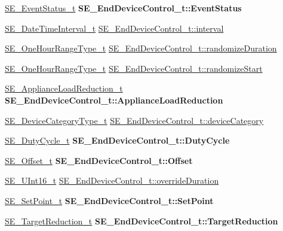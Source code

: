 \begin{DoxyCompactItemize}
\hyperlink{structSE__EventStatus__t}{S\+E\+\_\+\+Event\+Status\+\_\+t} {\bfseries S\+E\+\_\+\+End\+Device\+Control\+\_\+t\+::\+Event\+Status}
\item 
\hyperlink{structSE__DateTimeInterval__t}{S\+E\+\_\+\+Date\+Time\+Interval\+\_\+t} \hyperlink{group__EndDeviceControl_ga6b0199442cfc19ab1caaf0005b9d1900}{S\+E\+\_\+\+End\+Device\+Control\+\_\+t\+::interval}
\item 
\hyperlink{group__OneHourRangeType_ga2b9c57435b20a5fc0689922b77e97c2d}{S\+E\+\_\+\+One\+Hour\+Range\+Type\+\_\+t} \hyperlink{group__EndDeviceControl_ga403954727f4a26b9d25e0456d3f91340}{S\+E\+\_\+\+End\+Device\+Control\+\_\+t\+::randomize\+Duration}
\item 
\hyperlink{group__OneHourRangeType_ga2b9c57435b20a5fc0689922b77e97c2d}{S\+E\+\_\+\+One\+Hour\+Range\+Type\+\_\+t} \hyperlink{group__EndDeviceControl_gac9278298c4d98c9ba32267d7e113cce2}{S\+E\+\_\+\+End\+Device\+Control\+\_\+t\+::randomize\+Start}
\item 
\mbox{\label{group__EndDeviceControl_gaa5ebdac8477343a799d4adf53cc97e99}} 
\hyperlink{structSE__ApplianceLoadReduction__t}{S\+E\+\_\+\+Appliance\+Load\+Reduction\+\_\+t} {\bfseries S\+E\+\_\+\+End\+Device\+Control\+\_\+t\+::\+Appliance\+Load\+Reduction}
\item 
\hyperlink{group__DeviceCategoryType_gafc136ae19a3dd5b2fd2265d848ddeb2f}{S\+E\+\_\+\+Device\+Category\+Type\+\_\+t} \hyperlink{group__EndDeviceControl_ga1ecabe8c562fa33ae1294d90bc5a5bd2}{S\+E\+\_\+\+End\+Device\+Control\+\_\+t\+::device\+Category}
\item 
\mbox{\label{group__EndDeviceControl_ga3e647cfd1f964663b9fd8316471f6d06}} 
\hyperlink{structSE__DutyCycle__t}{S\+E\+\_\+\+Duty\+Cycle\+\_\+t} {\bfseries S\+E\+\_\+\+End\+Device\+Control\+\_\+t\+::\+Duty\+Cycle}
\item 
\mbox{\label{group__EndDeviceControl_gae3cdbe9385209dbb8b355c924864f565}} 
\hyperlink{structSE__Offset__t}{S\+E\+\_\+\+Offset\+\_\+t} {\bfseries S\+E\+\_\+\+End\+Device\+Control\+\_\+t\+::\+Offset}
\item 
\hyperlink{group__UInt16_gac68d541f189538bfd30cfaa712d20d29}{S\+E\+\_\+\+U\+Int16\+\_\+t} \hyperlink{group__EndDeviceControl_ga8a762812da5a0774db22d5b8984c4992}{S\+E\+\_\+\+End\+Device\+Control\+\_\+t\+::override\+Duration}
\item 
\mbox{\label{group__EndDeviceControl_ga48fd4b08751af1cc09de01b20e78e222}} 
\hyperlink{structSE__SetPoint__t}{S\+E\+\_\+\+Set\+Point\+\_\+t} {\bfseries S\+E\+\_\+\+End\+Device\+Control\+\_\+t\+::\+Set\+Point}
\item 
\mbox{\label{group__EndDeviceControl_gab7893eef857df0f94772f855017c46b7}} 
\hyperlink{structSE__TargetReduction__t}{S\+E\+\_\+\+Target\+Reduction\+\_\+t} {\bfseries S\+E\+\_\+\+End\+Device\+Control\+\_\+t\+::\+Target\+Reduction}
\end{DoxyCompactItemize}


